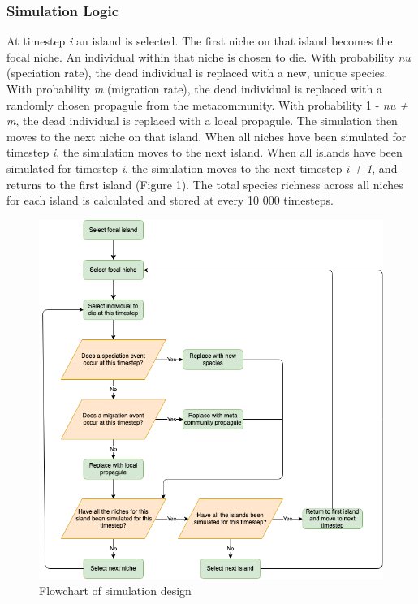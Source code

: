 \documentclass{article}
\begin{document}
\subsubsection{Simulation Logic}
At timestep \textit{i} an island is selected. The first niche on that island becomes the focal niche. An individual within that niche is chosen to die. With probability \textit{nu} (speciation rate), the dead individual is replaced with a new, unique species. With probability \textit{m} (migration rate), the dead individual is replaced with a randomly chosen propagule from the metacommunity. With probability 1 - \textit{nu + m}, the dead individual is replaced with a local propagule. The simulation then moves to the next niche on that island. When all niches have been simulated for timestep \textit{i}, the simulation moves to the next island. When all islands have been simulated for timestep \textit{i}, the simulation moves to the next timestep \textit{i + 1}, and returns to the first island (Figure 1). The total species richness across all niches for each island is calculated and stored at every 10 000 timesteps.

\bigskip
 
 \begin{figure}[h!]
\centering
  \includegraphics[scale=0.4]{../../Other/neutral_flowchart.png}
  \caption{Flowchart of simulation design}
  \label{fig:Flowchart}
\end{figure}
\end{document}
